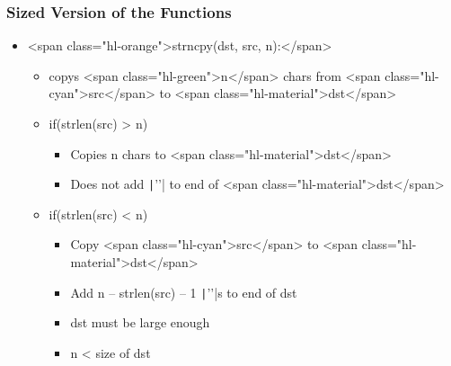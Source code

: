 \documentclass{../c-lecture}
\begin{document}
\begin{frame}
  \frametitle{Sized Version of the Functions}
  \begin{itemize}
    \item <span class="hl-orange">strncpy(dst, src, n):</span>
    \begin{itemize}
      \item
        copys <span class="hl-green">n</span> chars from
        <span class="hl-cyan">src</span> to <span class="hl-material">dst</span>

      \item if(strlen(src) > n)
      \begin{itemize}
        \item Copies n chars to <span class="hl-material">dst</span>
        \item
          Does not add \texttt|'\0'| to end of <span class="hl-material">dst</span>

      \end{itemize}
      \item if(strlen(src) < n)
      \begin{itemize}
        \item
          Copy <span class="hl-cyan">src</span> to
          <span class="hl-material">dst</span>

        \item
          Add n – strlen(src) – 1 \texttt|'\0'|s to end of
          dst

        \item dst must be large enough
        \item n < size of dst
      \end{itemize}
    \end{itemize}
  \end{itemize}
\end{frame}
\end{document}
